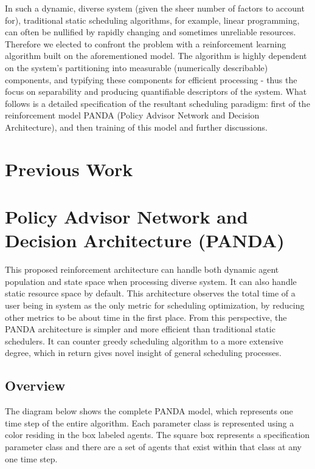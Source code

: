 \documentclass{article}
\theoremstyle{definition}
\theoremstyle{remark}
\begin{document}
	In such a dynamic, diverse system (given the sheer number of factors to account	for), traditional static scheduling algorithms, for example, linear programming, can often be nullified by rapidly changing and sometimes unreliable resources. Therefore we elected to confront the problem with a reinforcement learning algorithm built on the aforementioned model.	The algorithm is highly dependent on the system's partitioning into measurable (numerically describable) components, and typifying these components for efficient processing - thus the focus on separability and producing quantifiable descriptors of the system. What follows is a detailed specification of the resultant scheduling paradigm: first of the reinforcement model PANDA (Policy Advisor Network and Decision Architecture), and then training of this model and further discussions.
	
	
	
	\section{Previous Work}
	
	\section{Policy Advisor Network and Decision Architecture (PANDA)}
	
	This proposed reinforcement architecture can handle both dynamic agent population and state space when processing diverse system. It can also handle static resource space by default. This architecture observes the total time of a user being in system as the only metric for scheduling optimization, by reducing other metrics to be about time in the first place. From this perspective, the PANDA architecture is simpler and more efficient than traditional static schedulers. It can counter greedy scheduling algorithm to a more extensive degree, which in return gives novel insight of general scheduling processes.
		
		\subsection{Overview}
	
		The diagram below shows the complete PANDA model, which represents one time step of the entire algorithm. Each parameter class is represented using a color residing in the box labeled agents. The square box represents a specification parameter class and there are a set of agents that exist within that class at any one time step.
	
\end{document}
